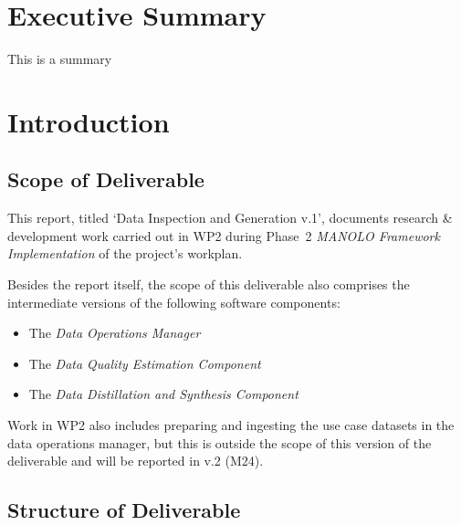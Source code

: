 \documentclass{manolo}
\newcommand{\quotes}[1]{`#1'}
\begin{document}
\section*{Executive Summary}

This is a summary



\section{Introduction}

\subsection{Scope of Deliverable}

This report, titled \quotes{Data Inspection and Generation v.1},
documents research \& development work carried out in WP2 during
Phase~2 \emph{MANOLO Framework Implementation} of the project's
workplan.

Besides the report itself, the scope of this deliverable also comprises
the intermediate versions of the following software components:
%
\begin{itemize}
\item The \emph{Data Operations Manager}
\item The \emph{Data Quality Estimation Component}
\item The \emph{Data Distillation and Synthesis Component}
\end{itemize}

Work in WP2 also includes preparing and ingesting the use case
datasets in the data operations manager, but this is outside the scope
of this version of the deliverable and will be reported in v.2 (M24).

\subsection{Structure of Deliverable}
\end{document}
